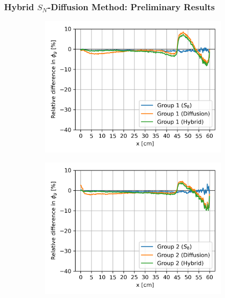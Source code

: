 \begin{frame}
  \frametitle{Hybrid $S_N$-Diffusion Method: Preliminary Results}
  \begin{figure}
    \centering
    \begin{subfigure}[t]{.34\textwidth}
      \centering
      \includegraphics[width=\textwidth]{../images/case-3b-group-1-flux-error}
      \label{fig:c3bg1e}
    \end{subfigure}
    \begin{subfigure}[t]{.34\textwidth}
      \centering
      \includegraphics[width=\textwidth]{../images/case-3b-group-2-flux-error}
      \label{fig:c3bg2e}
    \end{subfigure}
    \begin{subfigure}[t]{.34\textwidth}

\end{subfigure}
\end{figure}
\end{frame}

